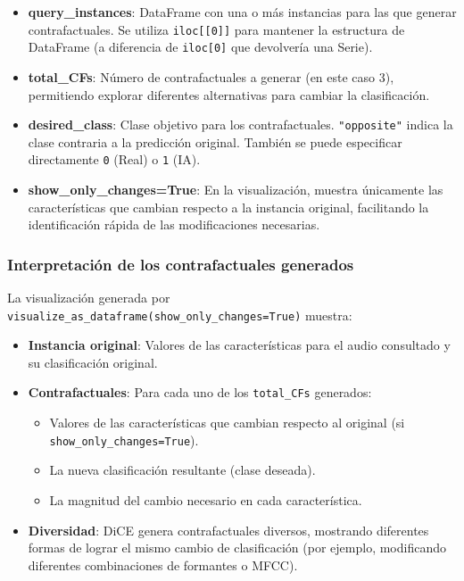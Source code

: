 \begin{itemize}
    \item \textbf{query\_instances}: DataFrame con una o más instancias para las que generar contrafactuales. Se utiliza \texttt{iloc[[0]]} para mantener la estructura de DataFrame (a diferencia de \texttt{iloc[0]} que devolvería una Serie).
    
    \item \textbf{total\_CFs}: Número de contrafactuales a generar (en este caso 3), permitiendo explorar diferentes alternativas para cambiar la clasificación.
    
    \item \textbf{desired\_class}: Clase objetivo para los contrafactuales. \texttt{"opposite"} indica la clase contraria a la predicción original. También se puede especificar directamente \texttt{0} (Real) o \texttt{1} (IA).
    
    \item \textbf{show\_only\_changes=True}: En la visualización, muestra únicamente las características que cambian respecto a la instancia original, facilitando la identificación rápida de las modificaciones necesarias.
\end{itemize}

\subsubsection*{Interpretación de los contrafactuales generados}

La visualización generada por \texttt{visualize\_as\_dataframe(show\_only\_changes=True)} muestra:

\begin{itemize}
    \item \textbf{Instancia original}: Valores de las características para el audio consultado y su clasificación original.
    
    \item \textbf{Contrafactuales}: Para cada uno de los \texttt{total\_CFs} generados:
    \begin{itemize}
        \item Valores de las características que cambian respecto al original (si \texttt{show\_only\_changes=True}).
        \item La nueva clasificación resultante (clase deseada).
        \item La magnitud del cambio necesario en cada característica.
    \end{itemize}
    
    \item \textbf{Diversidad}: DiCE genera contrafactuales diversos, mostrando diferentes formas de lograr el mismo cambio de clasificación (por ejemplo, modificando diferentes combinaciones de formantes o MFCC).
\end{itemize}

